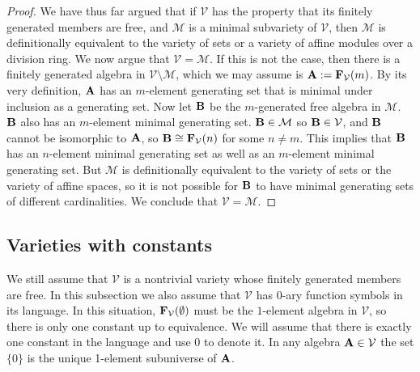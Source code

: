 \begin{proof}
We have thus far argued that if $\mathcal V$ has the property that
its finitely generated members are free, and $\mathcal M$ is a minimal
subvariety of $\mathcal V$, then $\mathcal M$ is definitionally
equivalent to the variety
of sets or a variety of affine modules over a division ring.
  We now argue that $\mathcal V = \mathcal M$. If this is not
  the case, then there is a finitely generated
  algebra in $\mathcal V\setminus\mathcal M$,
  which we may assume is ${{\mathbf{\uppercase{a}}}}:={{\mathbf{\uppercase{f}}}}_{\mathcal V}(m)$.
  By its very definition, ${{\mathbf{\uppercase{a}}}}$ has an $m$-element generating set
  that is minimal under inclusion as a generating set.
  Now let ${{\mathbf{\uppercase{b}}}}$ be the $m$-generated free algebra in $\mathcal M$.
  ${{\mathbf{\uppercase{b}}}}$ also has an $m$-element minimal generating set.
  ${{\mathbf{\uppercase{b}}}}\in{\mathcal M}$ so ${{\mathbf{\uppercase{b}}}}\in {\mathcal V}$, and
  ${{\mathbf{\uppercase{b}}}}$ cannot be isomorphic to ${{\mathbf{\uppercase{a}}}}$,
  so ${{\mathbf{\uppercase{b}}}} \cong {{\mathbf{\uppercase{f}}}}_{\mathcal V}(n)$
  for some $n\neq m$. This implies that ${{\mathbf{\uppercase{b}}}}$
  has an $n$-element minimal generating set as well as an
  $m$-element minimal generating set.
  But $\mathcal M$ is definitionally
  equivalent to the variety of sets or the variety
  of affine spaces, so it is not possible for ${{\mathbf{\uppercase{b}}}}$ to have minimal
  generating sets of different cardinalities.
  We conclude that $\mathcal V = \mathcal M$.
    \end{proof}

\subsection{Varieties with constants}\label{subsection2}

We still assume that 
$\mathcal V$ is a nontrivial variety whose finitely generated
members are free. In this subsection we also assume
that $\mathcal V$ has $0$-ary function symbols in its language.
In this situation, 
${{\mathbf{\uppercase{f}}}}_{\mathcal V}(\emptyset)$ must
be the $1$-element algebra in $\mathcal V$,
so there is only one constant up to equivalence.
We will assume that there is exactly one constant in the language and
use $0$ to denote it. In any algebra ${{\mathbf{\uppercase{a}}}}\in\mathcal V$
the set $\{0\}$ is the unique 1-element subuniverse of ${{\mathbf{\uppercase{a}}}}$.

